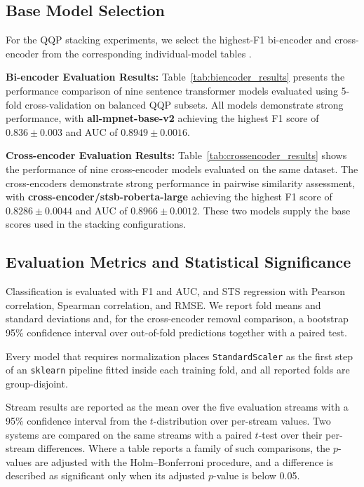 \documentclass[authoryear,preprint,review,12pt]{elsarticle}
\begin{document}
\subsection{Base Model Selection}
For the QQP stacking experiments, we select the highest-F1 bi-encoder and cross-encoder from the corresponding individual-model tables \citep{reimers2020making,gao2021simcse}.

\textbf{Bi-encoder Evaluation Results:} Table~\ref{tab:biencoder_results} presents the performance comparison of nine sentence transformer models evaluated using 5-fold cross-validation on balanced QQP subsets. All models demonstrate strong performance, with \textbf{all-mpnet-base-v2} achieving the highest F1 score of $0.836\pm0.003$ and AUC of $0.8949\pm0.0016$.

\textbf{Cross-encoder Evaluation Results:} Table~\ref{tab:crossencoder_results} shows the performance of nine cross-encoder models evaluated on the same dataset. The cross-encoders demonstrate strong performance in pairwise similarity assessment, with \textbf{cross-encoder/stsb-roberta-large} achieving the highest F1 score of $0.8286\pm0.0044$ and AUC of $0.8966\pm0.0012$. These two models supply the base scores used in the stacking configurations.

\subsection{Evaluation Metrics and Statistical Significance}
Classification is evaluated with F1 and AUC, and STS regression with Pearson correlation, Spearman correlation, and RMSE. We report fold means and standard deviations and, for the cross-encoder removal comparison, a bootstrap 95\% confidence interval over out-of-fold predictions together with a paired test.

Every model that requires normalization places \texttt{StandardScaler} as the first step of an \texttt{sklearn} pipeline fitted inside each training fold, and all reported folds are group-disjoint.

Stream results are reported as the mean over the five evaluation streams with a 95\% confidence interval from the $t$-distribution over per-stream values. Two systems are compared on the same streams with a paired $t$-test over their per-stream differences. Where a table reports a family of such comparisons, the $p$-values are adjusted with the Holm--Bonferroni procedure, and a difference is described as significant only when its adjusted $p$-value is below 0.05.
\end{document}
